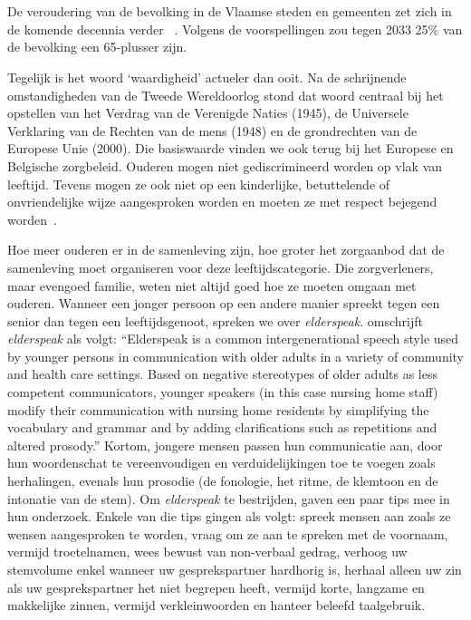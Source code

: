 
\chapter{}
\label{ch:inleiding}

De veroudering van de bevolking in de Vlaamse steden en gemeenten zet zich in de komende decennia verder ~\autocite{StatistiekVlaanderen2018}.
Volgens de voorspellingen zou tegen 2033 25\% van de bevolking een 65-plusser zijn.

Tegelijk is het woord `waardigheid' actueler dan ooit.
Na de schrijnende omstandigheden van de Tweede Wereldoorlog stond dat woord centraal bij het opstellen van het Verdrag van de Verenigde Naties (1945), de Universele Verklaring van de Rechten van de mens (1948) en de grondrechten van de Europese Unie (2000).
Die basiswaarde vinden we ook terug bij het Europese en Belgische zorgbeleid. Ouderen mogen niet gediscrimineerd worden op vlak van leeftijd. Tevens mogen ze ook niet op een kinderlijke, betuttelende of onvriendelijke wijze aangesproken worden en moeten ze met respect bejegend worden~\autocite{Campens2021}.

Hoe meer ouderen er in de samenleving zijn, hoe groter het zorgaanbod dat de samenleving moet organiseren voor deze leeftijdscategorie.
Die zorgverleners, maar evengoed familie, weten niet altijd goed hoe ze moeten omgaan met ouderen.
Wanneer een jonger persoon op een andere manier spreekt tegen een senior dan tegen een leeftijdsgenoot, spreken we over \textit{elderspeak}. \textcite{Williams2011} omschrijft \textit{elderspeak} als volgt: ``Elderspeak is a common intergenerational speech style used by younger persons in communication with older adults in a variety of community and health care settings. Based on negative stereotypes of older adults as less competent communicators, younger speakers (in this case nursing home staff) modify their communication with nursing home residents by simplifying the vocabulary and grammar and by adding clarifications such as repetitions and altered prosody.'' Kortom, jongere mensen passen hun communicatie aan, door hun woordenschat te vereenvoudigen en verduidelijkingen toe te voegen zoals herhalingen, evenals hun prosodie (de fonologie, het ritme, de klemtoon en de intonatie van de stem). Om \textit{elderspeak} te bestrijden, gaven \textcite{Wick2007} een paar tips mee in hun onderzoek.
Enkele van die tips gingen als volgt: spreek mensen aan zoals ze wensen aangesproken te worden, vraag om ze aan te spreken met de voornaam, vermijd troetelnamen, wees bewust van non-verbaal gedrag, verhoog uw stemvolume enkel wanneer uw gesprekspartner hardhorig is, herhaal alleen uw zin als uw gesprekspartner het niet begrepen heeft, vermijd korte, langzame en makkelijke zinnen, vermijd verkleinwoorden en hanteer beleefd taalgebruik.


